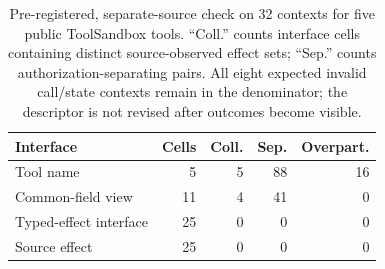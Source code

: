 \begin{table}[t]
\centering
\small
\setlength{\tabcolsep}{3.5pt}
\caption{Pre-registered, separate-source check on 32 contexts for five public
ToolSandbox tools. ``Coll.'' counts interface cells containing distinct
source-observed effect sets; ``Sep.'' counts authorization-separating pairs.
All eight expected invalid call/state contexts remain in the denominator;
the descriptor is not revised after outcomes become visible.}
\label{tab:toolsandbox-heldout}
\begin{tabular}{lrrrr}
\toprule
Interface & Cells & Coll. & Sep. & Overpart. \\
\midrule
Tool name & 5 & 5 & 88 & 16 \\
Common-field view & 11 & 4 & 41 & 0 \\
Typed-effect interface & 25 & 0 & 0 & 0 \\
Source effect & 25 & 0 & 0 & 0 \\
\bottomrule
\end{tabular}
\end{table}
